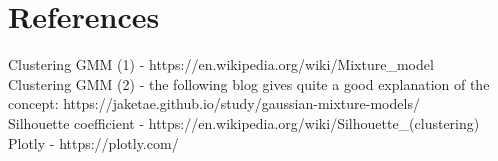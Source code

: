 \section{References}

Clustering GMM (1) - https://en.wikipedia.org/wiki/Mixture\_model \\

Clustering GMM (2)  - the following blog gives quite a good explanation of the concept: https://jaketae.github.io/study/gaussian-mixture-models/ \\

Silhouette coefficient - https://en.wikipedia.org/wiki/Silhouette\_(clustering) \\

Plotly - https://plotly.com/ \\


\vspace{10mm}